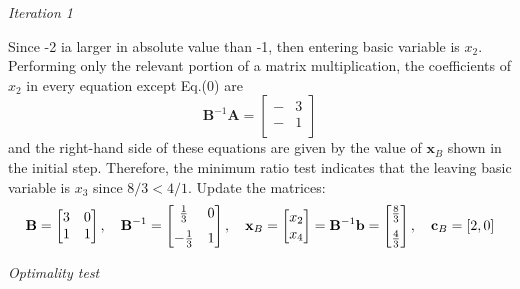 \documentclass[a4paper]{article}
\begin{document}
\begin{enumerate}
\begin{solution}
	\textit{Iteration 1}
	
	Since -2 ia larger in absolute value than -1, then entering basic variable is $x_2$. Performing only the relevant portion of a matrix multiplication, the coefficients of $x_2$ in every equation except Eq.(0) are
	\begin{equation*}
	\mathbf{B}^{-1}\mathbf{A}=\begin{bmatrix}
	-&3\\
	-&1\\
	\end{bmatrix}
	\end{equation*}
	and the right-hand side of these equations are given by the value of $\mathbf{x}_B$ shown in the initial step. Therefore, the minimum ratio test indicates that the leaving basic variable is $x_3$ since $8/3<4/1$. Update the matrices:
	\begin{equation*}
	\mathbf{B}=\begin{bmatrix}
	3&0\\
	1&1\\
	\end{bmatrix},\quad
	\mathbf{B}^{-1}=\begin{bmatrix}
	\tfrac{1}{3}&0\vspace*{0.2cm}\\
	-\tfrac{1}{3}&1\\
	\end{bmatrix},\quad
	\mathbf{x}_B=\begin{bmatrix}
	x_2\\
	x_4\\
	\end{bmatrix}=\mathbf{B}^{-1}\mathbf{b}=\begin{bmatrix}
	\tfrac{8}{3}\vspace*{0.2cm}\\
\tfrac{4}{3}\\
	\end{bmatrix},\quad
	\mathbf{c}_B=[2,0]
	\end{equation*}
	
	\textit{Optimality test}
	

\end{solution}
\end{enumerate}
\end{document}
